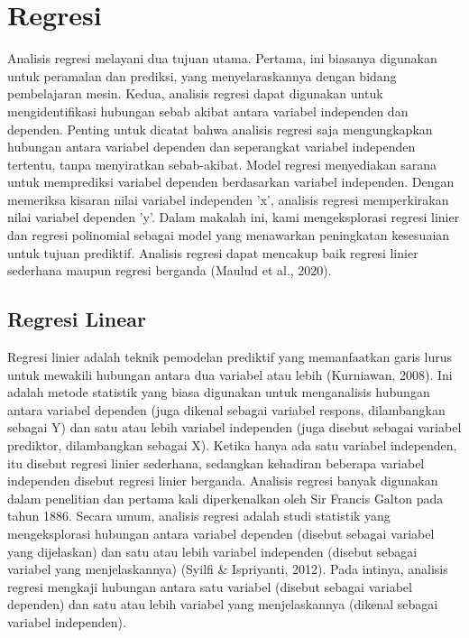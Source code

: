 \section{Regresi}
\label{sec:regresi}

Analisis regresi melayani dua tujuan utama. Pertama, ini biasanya digunakan untuk peramalan dan prediksi, yang menyelaraskannya dengan bidang pembelajaran mesin. Kedua, analisis regresi dapat digunakan untuk mengidentifikasi hubungan sebab akibat antara variabel independen dan dependen. Penting untuk dicatat bahwa analisis regresi saja mengungkapkan hubungan antara variabel dependen dan seperangkat variabel independen tertentu, tanpa menyiratkan sebab-akibat. Model regresi menyediakan sarana untuk memprediksi variabel dependen berdasarkan variabel independen. Dengan memeriksa kisaran nilai variabel independen 'x', analisis regresi memperkirakan nilai variabel dependen 'y'. Dalam makalah ini, kami mengeksplorasi regresi linier dan regresi polinomial sebagai model yang menawarkan peningkatan kesesuaian untuk tujuan prediktif. Analisis regresi dapat mencakup baik regresi linier sederhana maupun regresi berganda (Maulud et al., 2020).

\subsection{Regresi Linear}
\label{subsec:regresilinear}

Regresi linier adalah teknik pemodelan prediktif yang memanfaatkan garis lurus untuk mewakili hubungan antara dua variabel atau lebih (Kurniawan, 2008). Ini adalah metode statistik yang biasa digunakan untuk menganalisis hubungan antara variabel dependen (juga dikenal sebagai variabel respons, dilambangkan sebagai Y) dan satu atau lebih variabel independen (juga disebut sebagai variabel prediktor, dilambangkan sebagai X). Ketika hanya ada satu variabel independen, itu disebut regresi linier sederhana, sedangkan kehadiran beberapa variabel independen disebut regresi linier berganda. Analisis regresi banyak digunakan dalam penelitian dan pertama kali diperkenalkan oleh Sir Francis Galton pada tahun 1886. Secara umum, analisis regresi adalah studi statistik yang mengeksplorasi hubungan antara variabel dependen (disebut sebagai variabel yang dijelaskan) dan satu atau lebih variabel independen (disebut sebagai variabel yang menjelaskannya) (Syilfi \& Ispriyanti, 2012). Pada intinya, analisis regresi mengkaji hubungan antara satu variabel (disebut sebagai variabel dependen) dan satu atau lebih variabel yang menjelaskannya (dikenal sebagai variabel independen).

